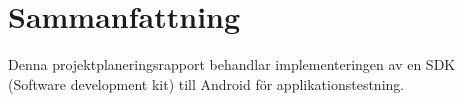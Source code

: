 \section*{Sammanfattning} %
Denna projektplaneringsrapport behandlar implementeringen av en SDK (Software development kit) till Android för applikationstestning.
